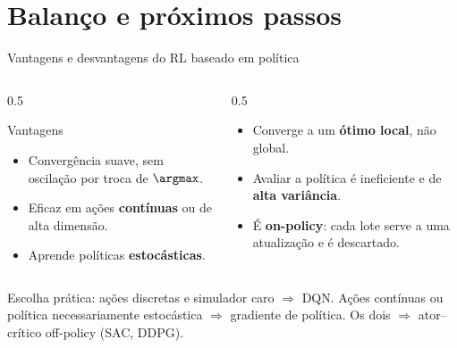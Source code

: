 \documentclass[aspectratio=169, 11pt]{beamer}
\begin{document}
\section{Balanço e próximos passos}

\begin{frame}{Vantagens e desvantagens do RL baseado em política}

  \begin{columns}[T]
  \begin{column}{0.5\textwidth}
    \begin{defbox}{Vantagens}
      \begin{itemize}\setlength{\itemsep}{0.2ex}
        \item Convergência suave, sem oscilação por troca de $\argmax$.
        \item Eficaz em ações \textbf{contínuas} ou de alta dimensão.
        \item Aprende políticas \textbf{estocásticas}.
      \end{itemize}
    \end{defbox}
  \end{column}
  \begin{column}{0.5\textwidth}
    \begin{alertabox}
      \begin{itemize}\setlength{\itemsep}{0.2ex}
        \item Converge a um \textbf{ótimo local}, não global.
        \item Avaliar a política é ineficiente e de \textbf{alta variância}.
        \item É \textbf{on-policy}: cada lote serve a uma atualização e é
          descartado.
      \end{itemize}
    \end{alertabox}
  \end{column}
  \end{columns}

  \begin{ideiabox}
    Escolha prática: ações discretas e simulador caro $\Rightarrow$ DQN. Ações
    contínuas ou política necessariamente estocástica $\Rightarrow$ gradiente
    de política. Os dois $\Rightarrow$ ator--crítico off-policy (SAC, DDPG).
  \end{ideiabox}
\end{frame}
\end{document}
